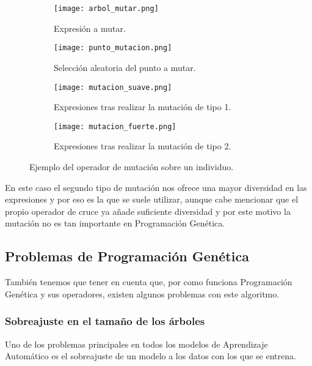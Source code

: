 \begin{figure}[H]
    \centering
	 \begin{subfigure}[b]{0.49\textwidth}
		 \centering
		 \texttt{[image: arbol\_mutar.png]}
		 \caption{Expresión a mutar.}
		 \label{fig:arbol_mutar}
	 \end{subfigure}
	\begin{subfigure}[b]{0.49\textwidth}
		 \centering
		\texttt{[image: punto\_mutacion.png]}
		\caption{Selección aleatoria del punto a mutar.}
		\label{fig:punto_mutacion}
   \end{subfigure}

	\begin{subfigure}[b]{0.49\textwidth}
		\centering
	  \texttt{[image: mutacion\_suave.png]}
	  \caption{Expresiones tras realizar la mutación de tipo 1.}
	  \label{fig:mutacion_suave}
   \end{subfigure}
	\begin{subfigure}[b]{0.49\textwidth}
		\centering
	  \texttt{[image: mutacion\_fuerte.png]}
	  \caption{Expresiones tras realizar la mutación de tipo 2.}
	  \label{fig:mutacion_fuerte}
	\end{subfigure}

	\caption{Ejemplo del operador de mutación sobre un individuo.}
	\label{fig:ej_mutacion_GP}
\end{figure}

En este caso el segundo tipo de mutación nos ofrece una mayor diversidad en las expresiones y por eso es la que se suele utilizar, aunque cabe mencionar que el propio operador de cruce ya añade suficiente diversidad y por este motivo la mutación no es tan importante en Programación Genética.

\subsection{Problemas de Programación Genética}

También tenemos que tener en cuenta que, por como funciona Programación Genética y sus operadores, existen algunos problemas con este algoritmo.

\subsubsection{Sobreajuste en el tamaño de los árboles}

Uno de los problemas principales en todos los modelos de Aprendizaje Automático es el sobreajuste de un modelo a los datos con los que se entrena.

